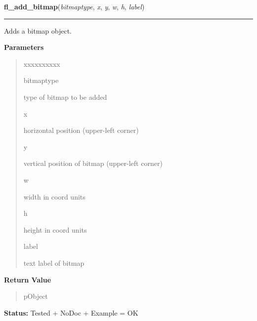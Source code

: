     \label{xformslib:library:fl_add_bitmap}

    \vspace{0.5ex}

\hspace{.8\funcindent}\begin{boxedminipage}{\funcwidth}

    \raggedright \textbf{fl\_add\_bitmap}(\textit{bitmaptype}, \textit{x}, \textit{y}, \textit{w}, \textit{h}, \textit{label})

    \vspace{-1.5ex}

    \rule{\textwidth}{0.5\fboxrule}
\setlength{\parskip}{2ex}
    Adds a bitmap object.

\setlength{\parskip}{1ex}
      \textbf{Parameters}
      \vspace{-1ex}

      \begin{quote}
        \begin{Ventry}{xxxxxxxxxx}

          \item[bitmaptype]

          type of bitmap to be added

          \item[x]

          horizontal position (upper-left corner)

          \item[y]

          vertical position of bitmap (upper-left corner)

          \item[w]

          width in coord units

          \item[h]

          height in coord units

          \item[label]

          text label of bitmap

        \end{Ventry}

      \end{quote}

      \textbf{Return Value}
    \vspace{-1ex}

      \begin{quote}
      pObject

      \end{quote}

\textbf{Status:} Tested + NoDoc + Example = OK



    \end{boxedminipage}

